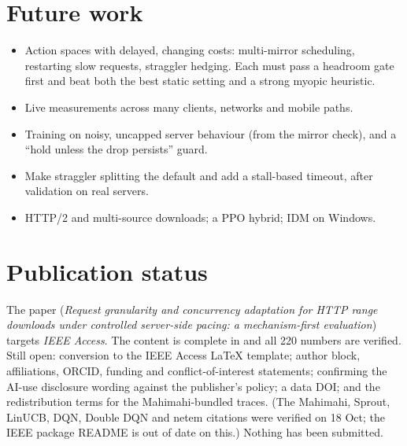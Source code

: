 \section{Future work}
\begin{itemize}
\item Action spaces with delayed, changing costs: multi-mirror scheduling, restarting slow requests, straggler hedging. Each must pass a headroom gate first and beat both the best static setting and a strong myopic heuristic.
\item Live measurements across many clients, networks and mobile paths.
\item Training on noisy, uncapped server behaviour (from the mirror check), and a ``hold unless the drop persists'' guard.
\item Make straggler splitting the default and add a stall-based timeout, after validation on real servers.
\item HTTP/2 and multi-source downloads; a PPO hybrid; IDM on Windows.
\end{itemize}

\section{Publication status}
The paper (\emph{Request granularity and concurrency adaptation for HTTP range downloads under controlled server-side pacing: a mechanism-first evaluation}) targets \emph{IEEE Access}. The content is complete in  and all 220 numbers are verified. Still open: conversion to the IEEE Access LaTeX template; author block, affiliations, ORCID, funding and conflict-of-interest statements; confirming the AI-use disclosure wording against the publisher's policy; a data DOI; and the redistribution terms for the Mahimahi-bundled traces. (The Mahimahi, Sprout, LinUCB, DQN, Double DQN and netem citations were verified on 18 Oct; the IEEE package README is out of date on this.) Nothing has been submitted.
